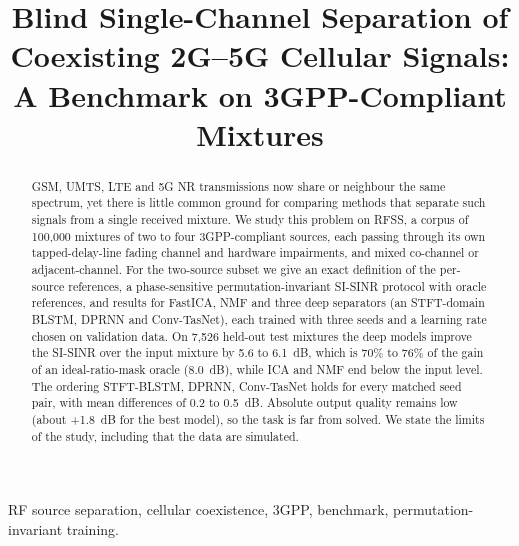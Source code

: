 \documentclass[conference]{IEEEtran}
\begin{document}
\title{Blind Single-Channel Separation of Coexisting 2G--5G Cellular Signals:\\
A Benchmark on 3GPP-Compliant Mixtures}

\author{
}

\maketitle

\begin{abstract}
GSM, UMTS, LTE and 5G NR transmissions now share or neighbour the same spectrum, yet
there is little common ground for comparing methods that separate such signals from a
single received mixture. We study this problem on RFSS, a corpus of 100,000 mixtures of
two to four 3GPP-compliant sources, each passing through its own tapped-delay-line fading
channel and hardware impairments, and mixed co-channel or adjacent-channel. For the
two-source subset we give an exact definition of the per-source references, a
phase-sensitive permutation-invariant SI-SINR protocol with oracle references, and results
for FastICA, NMF and three deep separators (an STFT-domain BLSTM, DPRNN and Conv-TasNet),
each trained with three seeds and a learning rate chosen on validation data. On 7,526 held-out
test mixtures the deep models improve the SI-SINR over the input mixture by 5.6 to 6.1~dB,
which is 70\% to 76\% of the gain of an ideal-ratio-mask oracle (8.0~dB), while ICA and NMF
end below the input level. The ordering STFT-BLSTM, DPRNN, Conv-TasNet holds for every
matched seed pair, with mean differences of 0.2 to 0.5~dB. Absolute output quality remains low (about
+1.8~dB for the best model), so the task is far from solved. We state the limits of the study,
including that the data are simulated.
\end{abstract}

\begin{IEEEkeywords}
RF source separation, cellular coexistence, 3GPP, benchmark, permutation-invariant training.
\end{IEEEkeywords}

\end{document}

